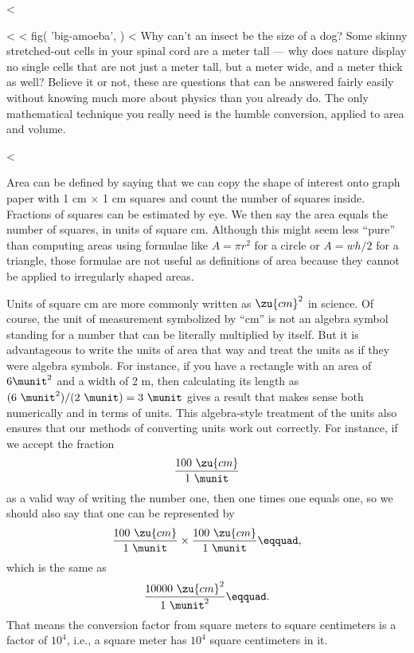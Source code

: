 <%

<%
<%
  fig(
    'big-amoeba',
  )
<%
Why can't an insect be the size of a dog? Some skinny
stretched-out cells in your spinal cord are a meter tall ---
why does nature display no single cells that are not just a
meter tall, but a meter wide, and a meter thick as well?
Believe it or not, these are questions that can be answered
fairly easily without knowing much more about physics than
you already do. The only mathematical technique you really
need is the humble conversion, applied to area and volume.

<%

Area can be defined by saying that we can copy the shape of
interest onto graph paper with 1 cm $\times$ 1 cm squares and
count the number of squares inside. Fractions of squares can
be estimated by eye. We then say the area equals the number
of squares, in units of square cm. Although this might seem
less ``pure'' than computing areas using formulae like
$A=\pi r^2$ for a circle or $A=wh/2$ for a triangle,
those formulae are not useful as definitions of area because
they cannot be applied to irregularly shaped areas.

Units of square cm are more commonly written as $\zu{cm}^2$ in
science. Of course, the unit of measurement symbolized by
``cm'' is not an algebra symbol standing for a number that
can be literally multiplied by itself. But it is advantageous
to write the units of area that way and treat the units as
if they were algebra symbols. For instance, if you have a
rectangle with an area of $6 \munit^2$ and a width of 2 m, then
calculating its length as $(6\ \munit^2)/(2\ \munit)=3\ \munit$ gives a result
that makes sense both numerically and in terms of units.
This algebra-style treatment of the units also ensures that
our methods of converting units work out correctly. For
instance, if we accept the fraction
\begin{equation*}
 \frac{100\ \zu{cm}}{1\ \munit}
\end{equation*}
as a valid way of writing the number one, then one times one
equals one, so we should also say that one can be represented by
\begin{equation*}
 \frac{100\ \zu{cm}}{1\ \munit} \times \frac{100\ \zu{cm}}{1\ \munit}\eqquad,
\end{equation*}
which is the same as
\begin{equation*}
 \frac{10000\ \zu{cm}^2}{1\ \munit^2}\eqquad.
\end{equation*}
That means the conversion factor from square meters to
square centimeters is a factor of  $10^4$, i.e., a square
meter has $10^4$  square centimeters in it.

